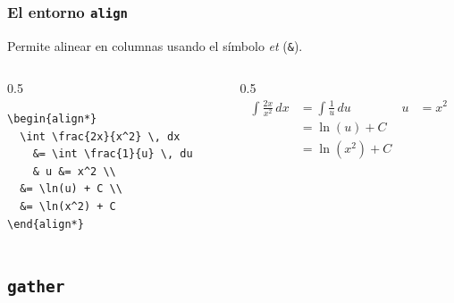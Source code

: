 \documentclass[12pt,aspectratio=169,ignorenonframetext]{ltxbeamer}
\begin{document}
\begin{frame}[fragile]
\frametitle{El entorno \texttt{align}}
Permite alinear en columnas usando el símbolo \emph{et} (\texttt{\&}).

\begin{columns}
    \begin{column}{0.5\textwidth}
        \begin{verbatim}
\begin{align*}
  \int \frac{2x}{x^2} \, dx
    &= \int \frac{1}{u} \, du
    & u &= x^2 \\
  &= \ln(u) + C \\
  &= \ln(x^2) + C
\end{align*}
        \end{verbatim}
    \end{column}
    {\color{gray} \vline}
    \begin{column}{0.5\textwidth}
        \begin{displaymath}
            \begin{aligned}
                \int \frac{2x}{x^2} \, dx
                    &= \int \frac{1}{u} \, du
                    & u &= x^2 \\
                &= \ln(u) + C \\
                &= \ln(x^2) + C
            \end{aligned}
        \end{displaymath}
    \end{column}
\end{columns}
\end{frame}





\subsection{\texttt{gather}}
\end{document}
